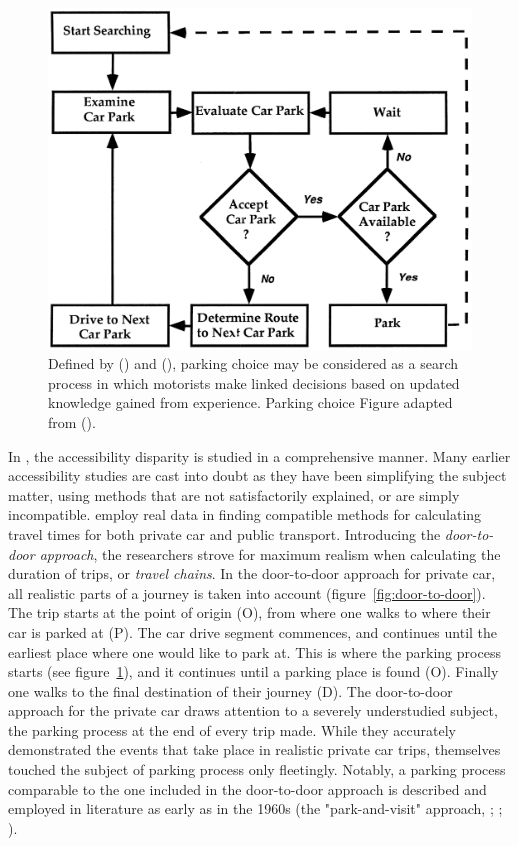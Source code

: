 \begin{figure}[H]%
    \centering
    \includegraphics[width=.75\textwidth]{images/thesis_parking_search_process_thompson1998.PNG}
    \caption[Parking search process]{Defined by \citeauthor{Layzell1985} (\citeyear{Layzell1985}) and \citeauthor{Polak1989} (\citeyear{Polak1989}), parking choice may be considered as a search process in which motorists make linked decisions based on updated knowledge gained from experience. Parking choice Figure adapted from \citeauthor{Thompson1998} (\citeyear{Thompson1998}).}%
    \label{fig:parking-process-thompson}%
\end{figure}

In , the accessibility disparity is studied in a comprehensive manner. Many earlier accessibility studies are cast into doubt as they have been simplifying the subject matter, using methods that are not satisfactorily explained, or are simply incompatible. \citeauthor{Salonen2013} employ real data in finding compatible methods for calculating travel times for both private car and public transport. Introducing the \textit{door-to-door approach}, the researchers strove for maximum realism when calculating the duration of trips, or \textit{travel chains}. In the door-to-door approach for private car, all realistic parts of a journey is taken into account (figure~\ref{fig:door-to-door}). The trip starts at the point of origin (O), from where one walks to where their car is parked at (P). The car drive segment commences, and continues until the earliest place where one would like to park at. This is where the parking process starts (see figure~\ref{fig:parking-process-thompson}), and it continues until a parking place is found (O). Finally one walks to the final destination of their journey (D). The door-to-door approach for the private car draws attention to a severely understudied subject, the parking process at the end of every trip made. While they accurately demonstrated the events that take place in realistic private car trips, \citeauthor{Salonen2013} themselves touched the subject of parking process only fleetingly. Notably, a parking process comparable to the one included in the door-to-door approach is described and employed in literature as early as in the 1960s (the "park-and-visit" approach, \cite{Inwood1966}; \cite{May1985}; \cite{Belloche2015}). 


